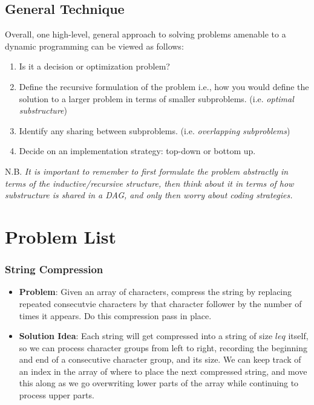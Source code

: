 \documentclass[10pt,a4paper]{article}
\begin{document}
\subsection*{General Technique}
Overall, one high-level, general approach to solving problems amenable to a dynamic programming can be viewed as follows:
\begin{enumerate}
    \item Is it a decision or optimization problem?
    \item Define the recursive formulation of the problem i.e., how you would define the solution to a larger problem in terms of smaller subproblems. (i.e. \textit{optimal substructure})
    \item Identify any sharing between subproblems. (i.e. \textit{overlapping subproblems})
    \item Decide on an implementation strategy: top-down or bottom up.
\end{enumerate}

N.B. \textit{It is important to remember to first formulate the problem abstractly in terms of the inductive/recursive structure, then think about it in terms of how substructure is shared in a DAG, and only then worry about coding strategies.}


\section*{Problem List}

\subsubsection*{String Compression}

\begin{itemize}
    \item \textbf{Problem}: Given an array of characters, compress the string by replacing repeated consecutvie characters by that character follower by the number of times it appears. Do this compression pass in place.
    \item \textbf{Solution Idea}: Each string will get compressed into a string of size $leq$ itself, so we can process character groups from left to right, recording the beginning and end of a consecutive character group, and its size. We can keep track of an index in the array of where to place the next compressed string, and move this along as we go overwriting lower parts of the array while continuing to process upper parts.
\end{itemize}
\end{document}
